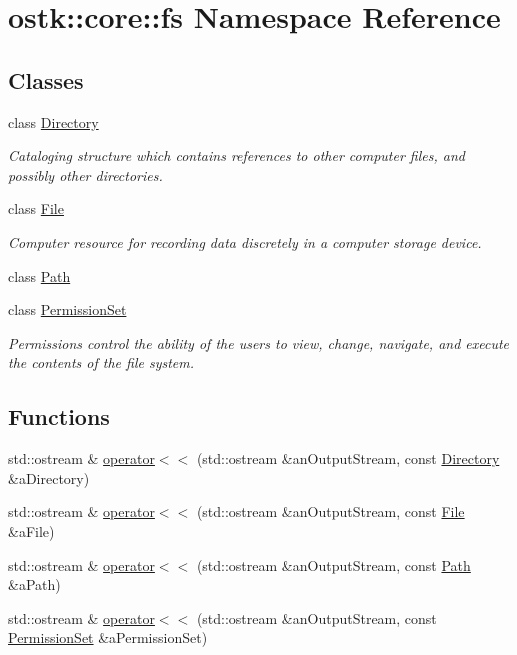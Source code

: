 \hypertarget{namespaceostk_1_1core_1_1fs}{}\section{ostk\+:\+:core\+:\+:fs Namespace Reference}
\label{namespaceostk_1_1core_1_1fs}
\subsection*{Classes}
\begin{DoxyCompactItemize}
\item 
class \hyperlink{classostk_1_1core_1_1fs_1_1_directory}{Directory}
\begin{DoxyCompactList}\small\item\em Cataloging structure which contains references to other computer files, and possibly other directories. \end{DoxyCompactList}\item 
class \hyperlink{classostk_1_1core_1_1fs_1_1_file}{File}
\begin{DoxyCompactList}\small\item\em Computer resource for recording data discretely in a computer storage device. \end{DoxyCompactList}\item 
class \hyperlink{classostk_1_1core_1_1fs_1_1_path}{Path}
\item 
class \hyperlink{classostk_1_1core_1_1fs_1_1_permission_set}{Permission\+Set}
\begin{DoxyCompactList}\small\item\em Permissions control the ability of the users to view, change, navigate, and execute the contents of the file system. \end{DoxyCompactList}\end{DoxyCompactItemize}
\subsection*{Functions}
\begin{DoxyCompactItemize}
\item 
std\+::ostream \& \hyperlink{namespaceostk_1_1core_1_1fs_a031dcbbcc59160b620952e1305e9ecf0}{operator$<$$<$} (std\+::ostream \&an\+Output\+Stream, const \hyperlink{classostk_1_1core_1_1fs_1_1_directory}{Directory} \&a\+Directory)
\item 
std\+::ostream \& \hyperlink{namespaceostk_1_1core_1_1fs_a64846cce39ea13a0173cf65151f33f04}{operator$<$$<$} (std\+::ostream \&an\+Output\+Stream, const \hyperlink{classostk_1_1core_1_1fs_1_1_file}{File} \&a\+File)
\item 
std\+::ostream \& \hyperlink{namespaceostk_1_1core_1_1fs_a292783717350a2d854b8bc48607ef9d4}{operator$<$$<$} (std\+::ostream \&an\+Output\+Stream, const \hyperlink{classostk_1_1core_1_1fs_1_1_path}{Path} \&a\+Path)
\item 
std\+::ostream \& \hyperlink{namespaceostk_1_1core_1_1fs_a60bcd30abe9b0a2f61d2f9e79d819540}{operator$<$$<$} (std\+::ostream \&an\+Output\+Stream, const \hyperlink{classostk_1_1core_1_1fs_1_1_permission_set}{Permission\+Set} \&a\+Permission\+Set)
\end{DoxyCompactItemize}


